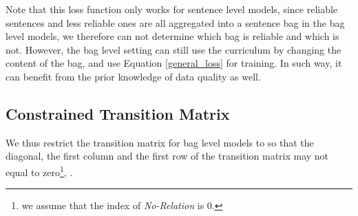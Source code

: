 Note that this loss function only works for sentence level models, since reliable sentences and less reliable ones are all aggregated into a sentence bag in the bag level models,  we therefore can not determine which bag is reliable and which is not. However, the bag level setting can still use the curriculum by changing the content of the bag,   and use Equation \ref{general_loss} for training. In such way, it can benefit from the prior knowledge of data quality as well.



\subsection{Constrained Transition Matrix} 
We  thus restrict the transition matrix for bag level models to  so that the diagonal, the first column and the first row of the transition matrix may not equal to zero\footnote{we assume that the index of \emph{No-Relation} is 0.}, .
